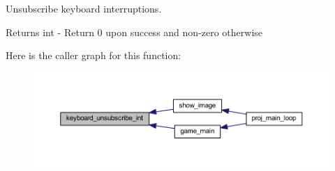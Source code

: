 Unsubscribe keyboard interruptions. 

\begin{DoxyReturn}{Returns}
int -\/ Return 0 upon success and non-\/zero otherwise 
\end{DoxyReturn}
Here is the caller graph for this function\+:
\nopagebreak
\begin{figure}[H]
\begin{center}
\leavevmode
\includegraphics[width=350pt]{group__keyboard_gac95aea27a5e91b363b876fed881f368f_icgraph}
\end{center}
\end{figure}
